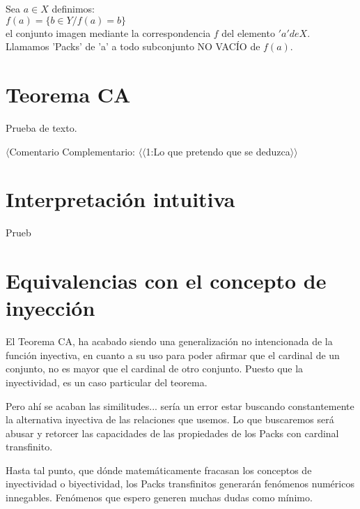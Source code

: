 \noindent 
Sea $a \in X$ definimos:\\
$f(a) = \{ b \in Y / f(a) = b \}$\\ 
el conjunto imagen mediante la correspondencia $f$ del elemento $'a' de X$.\\

\noindent 
Llamamos 'Packs' de 'a' a todo subconjunto NO VACÍO de $f(a)$.



\newpage
\section{Teorema CA}
Prueba de texto.


$\langle$Comentario Complementario: $\langle\langle$1:Lo que pretendo que se deduzca$\rangle\rangle$

\newpage
\section{Interpretación intuitiva}
Prueb

\newpage
\section{Equivalencias con el concepto de inyección}

El Teorema CA, ha acabado siendo una generalización no intencionada de la función inyectiva, en cuanto a su uso para poder afirmar que el cardinal de un conjunto, no es mayor que el cardinal de otro conjunto. Puesto que la inyectividad, es un caso particular del teorema.

Pero ahí se acaban las similitudes... sería un error estar buscando constantemente la alternativa inyectiva de las relaciones que usemos. Lo que buscaremos será abusar y retorcer las capacidades de las propiedades de los Packs con cardinal transfinito.

Hasta tal punto, que dónde matemáticamente fracasan los conceptos de inyectividad o biyectividad, los Packs transfinitos generarán fenómenos numéricos innegables. Fenómenos que espero generen muchas dudas como mínimo.